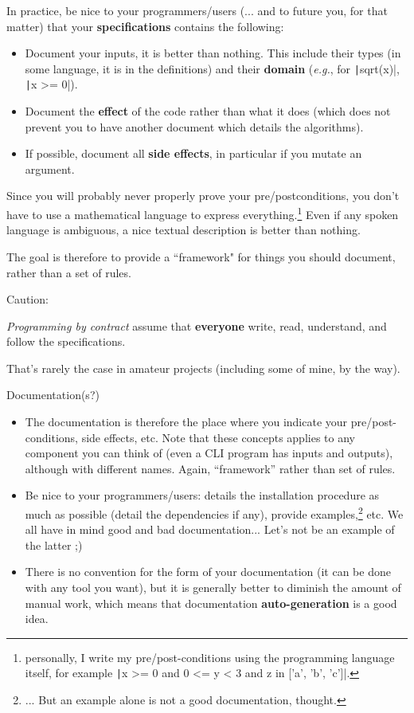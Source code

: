 \documentclass[10pt,
aspectratio=169
]{beamer}
\begin{document}
\begin{frame}
	In practice, be nice to your programmers/users (... and to future you, for that matter) that your \textbf{specifications} contains the following:\begin{itemize}
		\item Document your inputs, it is better than nothing. This include their types (in some language, it is in the definitions) and their \textbf{domain} (\textit{e.g.}, for \texttt|sqrt(x)|, \texttt|x >= 0|).
		\item Document the \textbf{effect} of the code rather than what it does (which does not prevent you to have another document which details the algorithms).
		\item If possible, document all \textbf{side effects}, in particular if you mutate an argument.
	\end{itemize}
	
	Since you will probably never properly prove your pre/postconditions, you don't have to use a mathematical language to express everything.\footnote{personally, I write my pre/post-conditions using the programming language itself, for example \texttt|x >= 0 and 0 <= y < 3 and z in ['a', 'b', 'c']|.} Even if any spoken language is ambiguous, a nice textual description is better than nothing.
	
	The goal is therefore to provide a ``framework" for things you should document, rather than a set of rules.
\end{frame}

\begin{frame}
	Caution:
\begin{center}
	{\LARGE \textit{Programming by contract} assume that \textbf{everyone} write, read, understand, and follow the specifications.}
\end{center}
That's rarely the case in amateur projects (including some of mine, by the way).
\end{frame}

\begin{frame}{Documentation(s?)}
	\begin{itemize}
		\item The documentation is therefore the place where you indicate your pre/post-conditions, side effects, etc. Note that these concepts applies to any component you can think of (even a CLI program has inputs and outputs), although with different names. Again, ``framework'' rather than set of rules.
		\item Be nice to your programmers/users: details the installation procedure as much as possible (detail the dependencies if any), provide examples,\footnote{... But an example alone is not a good documentation, thought.} etc. We all have in mind good and bad documentation... Let's not be an example of the latter ;)
		\item There is no convention for the form of your documentation (it can be done with any tool you want), but it is generally better to diminish the amount of manual work, which means that documentation \textbf{auto-generation} is a good idea.
	\end{itemize}
\end{frame}
\end{document}
